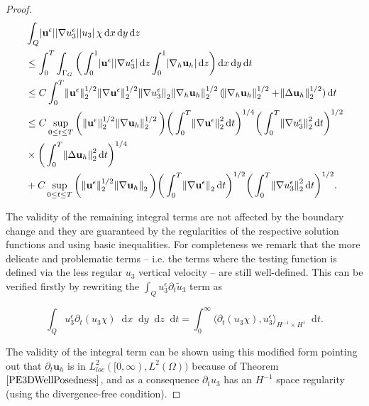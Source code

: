 \documentclass[11pt]{article}
\newcommand*\diff{\mathop{}\!\mathrm{d}}
\begin{document}
\begin{proof}
\begin{equation}
  \begin{split}
    & \int_Q \abs{\mathbf{u}^\epsilon} \abs{\nabla u_3^\epsilon} \abs{u_3} \chi \diff x \diff y \diff z \\
    & \leq  \int_0 ^ T \int_{\Gamma_G} \bigg ( \int_0^1 \abs{\mathbf{u}^\epsilon} \abs{\nabla u_3^\epsilon} \diff z \int_0^1 \abs{\nabla_h \mathbf{u}_h} \diff z \bigg ) \diff x \diff y \diff t \\
    & \leq C \int_0^T \norm{\mathbf{u}^\epsilon}_2^{1/2} \norm{\nabla \mathbf{u}^\epsilon}_2^{1/2} \norm{\nabla u_3^\epsilon}_2 \norm{\nabla_h \mathbf{u}_h}_2^{1/2} (\norm{\nabla_h \mathbf{u}_h}_2^{1/2} + \norm{\Delta \mathbf{u}_h}_2^{1/2}) \diff t \\
    & \leq C \sup_{0 \leq t \leq T} \bigg( \norm{\mathbf{u}^\epsilon}_2^{1/2} \norm{\nabla \mathbf{u}_h}_2^{1/2} \bigg) \bigg( \int_0^T \norm{\nabla \mathbf{u}^\epsilon}^2_2 \diff t \bigg)^{1/4} \bigg ( \int_0^T \norm{\nabla u_3^\epsilon}_2^2 \diff t \bigg)^{1/2} \\
    & \times \bigg ( \int_0^T \norm{\Delta \mathbf{u}_h}_2^2 \diff t \bigg )^{1/4} \\
    & + C \sup_{0 \leq t \leq T} \bigg( \norm{\mathbf{u}^\epsilon}_2^{1/2} \norm{\nabla \mathbf{u}_h}_2 \bigg) \bigg( \int_0^T \norm{\nabla \mathbf{u}^\epsilon}_2 \diff t \bigg)^{1/2} \bigg ( \int_0^T \norm{\nabla u_3^\epsilon}_2^2 \diff t \bigg)^{1/2}.\raisetag{60pt}
  \end{split}
\end{equation}

The validity of the remaining integral terms are not affected by the boundary change and they are guaranteed by the regularities of the respective solution functions and using basic inequalities. For completeness we remark that the more delicate and problematic terms -- i.e. the terms where the testing function is defined via the less regular $u_3$ vertical velocity -- are still well-defined. This can be verified firstly by rewriting the $\int_Q u^\epsilon_3 \partial_t \tilde{u}_3$ term as

$$ \int_Q u^\epsilon_3 \partial_t (u_3 \chi) \diff x \diff y \diff z \diff t = \int_0^\infty \langle \partial_t (u_3 \chi), u^\epsilon_3 \rangle _ {H^{-1} \times H^1} \diff t.$$

The validity of the integral term can be shown using this modified form pointing out that $\partial_t \mathbf{u}_h$ is in $L^2_{loc} ([0,\infty), L^2(\Omega))$ because of Theorem $\ref{PE3DWellPosedness}$, and as a consequence $\partial_t u_3$ has an $H^{-1}$ space regularity (using the divergence-free condition).


\end{proof}
\end{document}
